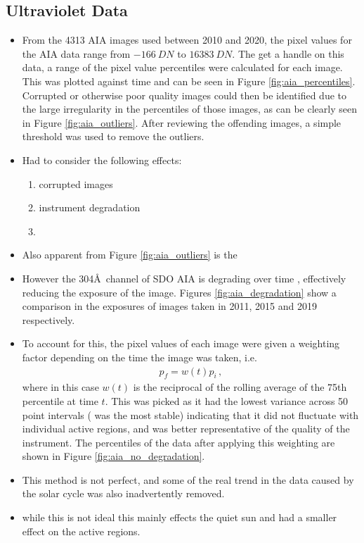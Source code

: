 \documentclass[11pt,a4paper,onecolumn]{report}
\begin{document}
\subsection{Ultraviolet Data}
\begin{itemize}
  \item From the 4313 AIA images used between 2010 and 2020, the pixel values
  for the AIA data range from \(\SI[]{-166}[]{DN}\) to \(\SI[]{16383}[]{DN}\).
  The get a handle on this data, a range of the pixel value percentiles were
  calculated for each image. This was plotted against time and can be seen in
  Figure \ref{fig:aia_percentiles}. Corrupted or otherwise poor quality images
  could then be identified due to the large irregularity in the percentiles of
  those images, as can be clearly seen in Figure \ref{fig:aia_outliers}. After
  reviewing the offending images, a simple threshold was used to remove the
  outliers.
  \item Had to consider the following effects:
  \begin{enumerate}
    \item corrupted images
    \item instrument degradation
    \item 
  \end{enumerate}
  \item Also apparent from Figure \ref{fig:aia_outliers} is the 
  \item However the 304\AA \ channel of SDO AIA is degrading over time
  \citep{boerner_photometric_2014}, effectively reducing the exposure of the
  image. Figures \ref{fig:aia_degradation} show a comparison in the exposures of
  images taken in 2011, 2015 and 2019 respectively. 
  \item To account for this, the pixel values of each image were given a
  weighting factor depending on the time the image was taken, i.e.
  \begin{align}
    p_f = w(t) p_i \, ,
  \end{align}
  where in this case $w(t)$ is the reciprocal of the rolling average of the 75th
  percentile at time $t$. This was picked as it had the lowest variance across
  50 point intervals ( was the most stable) indicating that it did not fluctuate
  with individual active regions, and was better representative of the quality
  of the instrument. The percentiles of the data after applying this
  weighting are shown in Figure \ref{fig:aia_no_degradation}.
  \item This method is not perfect, and some of the real trend in the data
  caused by the solar cycle was also inadvertently removed.
  \item while this is not ideal this mainly effects the quiet sun and had a
  smaller effect on the active regions.


\end{itemize}
\end{document}
